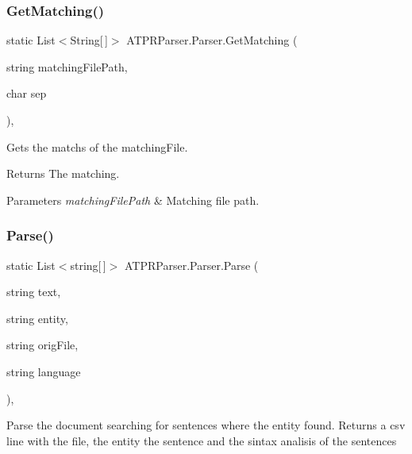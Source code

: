 \subsubsection{\texorpdfstring{Get\+Matching()}{GetMatching()}}
{\footnotesize\ttfamily static List$<$String\mbox{[}$\,$\mbox{]}$>$ A\+T\+P\+R\+Parser.\+Parser.\+Get\+Matching (\begin{DoxyParamCaption}\item[{string}]{matching\+File\+Path,  }\item[{char}]{sep }\end{DoxyParamCaption})\hspace{0.3cm}{\ttfamily [inline]}, {\ttfamily [static]}}



Gets the matchs of the matching\+File. 

\begin{DoxyReturn}{Returns}
The matching.
\end{DoxyReturn}

\begin{DoxyParams}{Parameters}
{\em matching\+File\+Path} & Matching file path.\\
\hline
\end{DoxyParams}
\hypertarget{class_a_t_p_r_parser_1_1_parser_a4d0782c4136575c1b9a33102be225ea1}{}\label{class_a_t_p_r_parser_1_1_parser_a4d0782c4136575c1b9a33102be225ea1} 
\subsubsection{\texorpdfstring{Parse()}{Parse()}}
{\footnotesize\ttfamily static List$<$string\mbox{[}$\,$\mbox{]}$>$ A\+T\+P\+R\+Parser.\+Parser.\+Parse (\begin{DoxyParamCaption}\item[{string}]{text,  }\item[{string}]{entity,  }\item[{string}]{orig\+File,  }\item[{string}]{language }\end{DoxyParamCaption})\hspace{0.3cm}{\ttfamily [inline]}, {\ttfamily [static]}}



Parse the document searching for sentences where the entity found. Returns a csv line with the file, the entity the sentence and the sintax analisis of the sentences 


